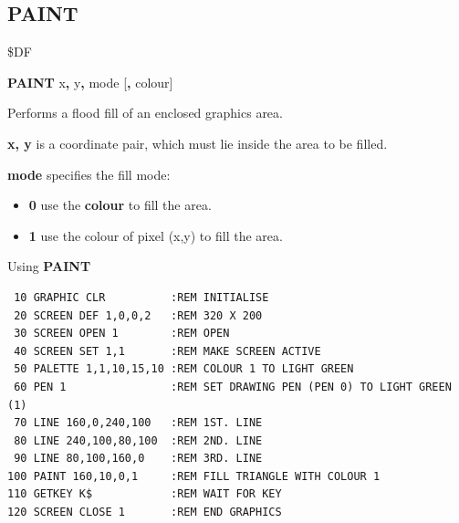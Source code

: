 
\newpage
\subsection{PAINT}
\begin{description}[leftmargin=2cm,style=nextline]
\item [Token:] \$DF
\item [Format:] {\bf PAINT} x{\bf,} y{\bf,} mode [{\bf,} colour]
\item [Usage:]  Performs a flood fill
                of an enclosed graphics area.

                {\bf x, y} is a coordinate pair, which must
                lie inside the area to be filled.

                {\bf mode} specifies the fill mode:
                \begin{itemize}
                    \item {\bf 0} use the {\bf colour} to fill the area.
                    \item {\bf 1} use the colour of pixel (x,y) to fill the area.
                \end{itemize}


\item [Example:] Using {\bf PAINT}

\begin{tcolorbox}[colback=black,coltext=white]
\verbatimfont{\codefont}
\begin{verbatim}
 10 GRAPHIC CLR          :REM INITIALISE
 20 SCREEN DEF 1,0,0,2   :REM 320 X 200
 30 SCREEN OPEN 1        :REM OPEN
 40 SCREEN SET 1,1       :REM MAKE SCREEN ACTIVE
 50 PALETTE 1,1,10,15,10 :REM COLOUR 1 TO LIGHT GREEN
 60 PEN 1                :REM SET DRAWING PEN (PEN 0) TO LIGHT GREEN (1)
 70 LINE 160,0,240,100   :REM 1ST. LINE
 80 LINE 240,100,80,100  :REM 2ND. LINE
 90 LINE 80,100,160,0    :REM 3RD. LINE
100 PAINT 160,10,0,1     :REM FILL TRIANGLE WITH COLOUR 1
110 GETKEY K$            :REM WAIT FOR KEY
120 SCREEN CLOSE 1       :REM END GRAPHICS
\end{verbatim}
\end{tcolorbox}
\end{description}


\newpage
